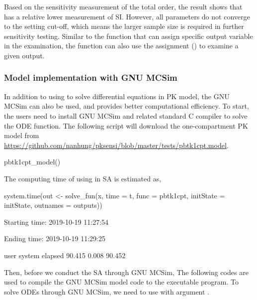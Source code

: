 Based on the sensitivity measurement of the total order, the result
shows that  has a relative lower measurement of SI. However,
all parameters do not converge to the setting cut-off, which means the
larger sample size is required in further sensitivity testing. Similar
to the  function that can assign specific output variable in
the examination, the  function can also use the assignment
() to examine a given output.

\hypertarget{model-implementation-with-gnu-mcsim}{%
\subsubsection{Model implementation with GNU
MCSim}\label{model-implementation-with-gnu-mcsim}}

In addition to using  to solve differential equations
in PK model, the GNU MCSim can also be used, and provides better
computational efficiency. To start, the users need to install GNU MCSim
and related standard C compiler to solve the ODE function. The following
script will download the one-compartment PK model from
\url{https://github.com/nanhung/pksensi/blob/master/tests/pbtk1cpt.model}.

\begin{Schunk}
\begin{Sinput}
pbtk1cpt_model()
\end{Sinput}
\end{Schunk}

The computing time of using  in SA is estimated as,

\begin{Schunk}
\begin{Sinput}
system.time(out <- solve_fun(x, time = t, 
                             func = pbtk1cpt, initState = initState, 
                             outnames = outputs))
\end{Sinput}
\begin{Soutput}
  Starting time: 2019-10-19 11:27:54
\end{Soutput}
\begin{Soutput}
  Ending time: 2019-10-19 11:29:25
\end{Soutput}
\begin{Soutput}
     user  system elapsed 
   90.415   0.008  90.452
\end{Soutput}
\end{Schunk}

Then, before we conduct the SA through GNU MCSim, The following codes
are used to compile the GNU MCSim model code to the executable program.
To solve ODEs through GNU MCSim, we need to use 
with argument .

